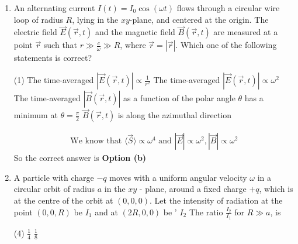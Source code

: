 \begin{enumerate}
	{}
	\begin{tasks}(2)
		\task[\textbf{a.}]$I_{0} \omega /\left(12 \pi \varepsilon_{0} c^{3}\right)$
		\task[\textbf{b.}]$I_{0}^{2} \omega^{2} /\left(12 \pi \varepsilon_{0} c^{3}\right)$
		\task[\textbf{c.}]$I_{0}^{2} \omega^{3} /\left(12 \pi \varepsilon_{0} c^{3}\right)$
		\task[\textbf{d.}] $I_{0}^{2} \omega^{4} /\left(12 \pi \varepsilon_{0} c^{3}\right)$
	\end{tasks}
\begin{answer}
	So the correct answer is \textbf{Option (d)}
\end{answer}
	\item  An alternating current $I(t)=I_{0} \cos (\omega t)$ flows through a circular wire loop of radius $R$, lying in the $x y$-plane, and centered at the origin. The electric field $\vec{E}(\vec{r}, t)$ and the magnetic field $\vec{B}(\vec{r}, t)$ are measured at a point $\vec{r}$ such that $r \gg \frac{c}{\omega} \gg R$, where $\vec{r}=|\vec{r}|$.
	Which one of the following statements is correct?
	{}
	\begin{tasks}(1)
		\task[\textbf{a.}] The time-averaged $|\vec{E}(\vec{r}, t)| \propto \frac{1}{r^{2}}$
		\task[\textbf{b.}]The time-averaged $|\vec{E}(\vec{r}, t)| \propto \omega^{2}$
		\task[\textbf{c.}]The time-averaged $|\vec{B}(\vec{r}, t)|$ as a function of the polar angle $\theta$ has a minimum at $\theta=\frac{\pi}{2}$
		\task[\textbf{d.}] $\vec{B}(\vec{r}, t)$ is along the azimuthal direction
	\end{tasks}
\begin{answer}
	\begin{align*}
	\text{We know that }\langle\vec{S}\rangle \propto \omega^{4}\text{ and }|\vec{E}| \propto \omega^{2},|\vec{B}| \propto \omega^{2}
	\end{align*}
	So the correct answer is \textbf{Option (b)}
\end{answer}
	\item   A particle with charge $-q$ moves with a uniform angular velocity $\omega$ in a circular orbit of radius $a$ in the $x y$ - plane, around a fixed charge $+q$, which is at the centre of the orbit at $(0,0,0)$. Let the intensity of radiation at the point $(0,0, R)$ be $I_{1}$ and at $(2 R, 0,0)$ be ' $I_{2}$ The ratio $\frac{I_{2}}{I_{1}}$ for $R \gg a$, is
	{}
	\begin{tasks}(4)
		\task[\textbf{b.}]$\frac{1}{4}$
		\task[\textbf{c.}]$\frac{1}{8}$

\end{tasks}
\end{enumerate}
